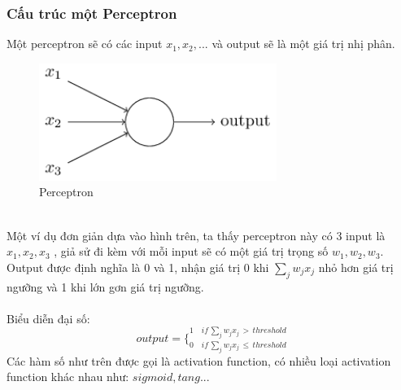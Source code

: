 \subsubsection{Cấu trúc một Perceptron}
Một perceptron sẽ có các input $x_1, x_2, ...$ và output sẽ là một giá trị 
nhị phân.\\
\begin{figure}[h!]
\centering
\includegraphics[height=1.5in, keepaspectratio=true]{perceptron.png}
\caption{Perceptron}
\end{figure}\\
Một ví dụ đơn giản dựa vào hình trên, ta thấy perceptron này có 3 input là 
$x_1, x_2, x_3$ , giả sử đi kèm với mỗi input sẽ có một giá trị trọng 
số $w_1, w_2, w_3$. Output được định nghĩa là 0 và 1, nhận giá trị 0 
khi $\sum_j w_j x_j$ nhỏ hơn giá trị ngưỡng và 1 khi lớn gơn giá trị ngưỡng.\\\\
Biểu diễn đại số:\\
\[
  output = 
  \bigg\{
    _{0 \quad if \, \sum_j w_j x_j \, \leq \, threshold}
    ^{1 \quad if \, \sum_j w_j x_j \, > \, threshold}
\]
Các hàm số như trên được gọi là activation function, có nhiều loại activation
 function khác nhau như: $sigmoid , tang ...$ 

